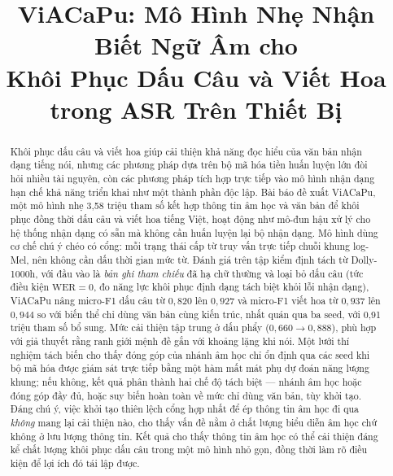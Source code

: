 \documentclass[conference,onecolumn]{IEEEtran}
\begin{document}
\title{ViACaPu: Mô Hình Nhẹ Nhận Biết Ngữ Âm cho\\
Khôi Phục Dấu Câu và Viết Hoa trong ASR Trên Thiết Bị}

\author{
}

\maketitle

\begin{abstract}
Khôi phục dấu câu và viết hoa giúp cải thiện khả năng đọc hiểu của văn bản nhận
dạng tiếng nói, nhưng các phương pháp dựa trên bộ mã hóa tiền huấn luyện lớn đòi
hỏi nhiều tài nguyên, còn các phương pháp tích hợp trực tiếp vào mô hình nhận dạng
hạn chế khả năng triển khai như một thành phần độc lập. Bài báo đề xuất ViACaPu,
một mô hình nhẹ 3,58 triệu tham số kết hợp thông tin âm học và văn bản để khôi
phục đồng thời dấu câu và viết hoa tiếng Việt, hoạt động như mô-đun hậu xử lý cho
hệ thống nhận dạng có sẵn mà không cần huấn luyện lại bộ nhận dạng. Mô hình dùng
cơ chế chú ý chéo có cổng: mỗi trạng thái cấp từ truy vấn trực tiếp chuỗi khung
log-Mel, nên không cần dấu thời gian mức từ. Đánh giá trên tập kiểm định tách từ
Dolly-1000h, với đầu vào là \emph{bản ghi tham chiếu} đã hạ chữ thường và loại bỏ
dấu câu (tức điều kiện $\mathrm{WER}=0$, đo năng lực khôi phục định dạng tách biệt
khỏi lỗi nhận dạng), ViACaPu nâng micro-F1 dấu câu từ $0{,}820$ lên $0{,}927$ và
micro-F1 viết hoa từ $0{,}937$ lên $0{,}944$ so với biến thể chỉ dùng văn bản cùng
kiến trúc, nhất quán qua ba seed, với 0,91 triệu tham số bổ sung. Mức cải thiện
tập trung ở dấu phẩy ($0{,}660 \rightarrow 0{,}888$), phù hợp với giả thuyết rằng
ranh giới mệnh đề gắn với khoảng lặng khi nói. Một lưới thí nghiệm tách biến cho
thấy đóng góp của nhánh âm học chỉ ổn định qua các seed khi bộ mã hóa được giám
sát trực tiếp bằng một hàm mất mát phụ dự đoán năng lượng khung; nếu không, kết
quả phân thành hai chế độ tách biệt --- nhánh âm học hoặc đóng góp đầy đủ, hoặc
suy biến hoàn toàn về mức chỉ dùng văn bản, tùy khởi tạo. Đáng chú ý, việc khởi
tạo thiên lệch cổng hợp nhất để ép thông tin âm học đi qua \emph{không} mang lại
cải thiện nào, cho thấy vấn đề nằm ở chất lượng biểu diễn âm học chứ không ở lưu
lượng thông tin. Kết quả cho thấy thông tin âm học có thể cải thiện đáng kể chất
lượng khôi phục dấu câu trong một mô hình nhỏ gọn, đồng thời làm rõ điều kiện để
lợi ích đó tái lập được.
\end{abstract}
\end{document}
